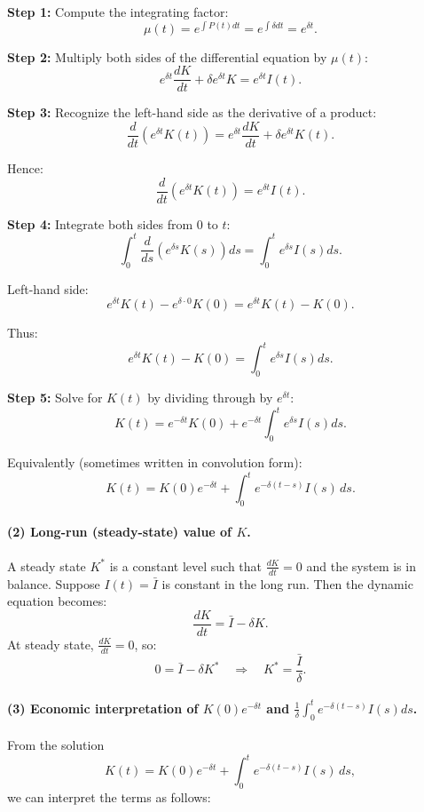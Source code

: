 \documentclass[12pt]{article}
\begin{document}
\textbf{Step 1:} Compute the integrating factor:
\[
\mu(t) = e^{\int P(t)dt} = e^{\int \delta dt} = e^{\delta t}.
\]

\textbf{Step 2:} Multiply both sides of the differential equation by $\mu(t)$:
\[
e^{\delta t}\frac{dK}{dt} + \delta e^{\delta t}K = e^{\delta t}I(t).
\]

\textbf{Step 3:} Recognize the left-hand side as the derivative of a product:
\[
\frac{d}{dt}(e^{\delta t}K(t)) 
= e^{\delta t}\frac{dK}{dt} + \delta e^{\delta t}K(t).
\]

Hence:
\[
\frac{d}{dt}(e^{\delta t}K(t)) = e^{\delta t} I(t).
\]

\textbf{Step 4:} Integrate both sides from $0$ to $t$:
\[
\int_0^t \frac{d}{ds}(e^{\delta s}K(s))ds = \int_0^t e^{\delta s}I(s)ds.
\]

Left-hand side:
\[
e^{\delta t}K(t) - e^{\delta \cdot 0}K(0) 
= e^{\delta t}K(t) - K(0).
\]

Thus:
\[
e^{\delta t}K(t) - K(0) = \int_0^t e^{\delta s}I(s)ds.
\]

\textbf{Step 5:} Solve for $K(t)$ by dividing through by $e^{\delta t}$:
\[
K(t) = e^{-\delta t}K(0) + e^{-\delta t}\int_0^t e^{\delta s}I(s)ds.
\]

Equivalently (sometimes written in convolution form):
\[
\boxed{
K(t)
= K(0)e^{-\delta t} 
+ \int_0^t e^{-\delta (t-s)}I(s)\,ds.
}
\]

\paragraph{(2) Long-run (steady-state) value of $K$.}

A steady state $K^*$ is a constant level such that $\frac{dK}{dt}=0$ and the system is in balance. Suppose $I(t)=\bar{I}$ is constant in the long run. Then the dynamic equation becomes:
\[
\frac{dK}{dt} = \bar{I} - \delta K.
\]
At steady state, $\frac{dK}{dt}=0$, so:
\[
0 = \bar{I} - \delta K^*
\quad\Rightarrow\quad
K^* = \frac{\bar{I}}{\delta}.
\]

\paragraph{(3) Economic interpretation of $K(0)e^{-\delta t}$ and $\displaystyle\frac{1}{\delta}\int_0^t e^{-\delta (t-s)}I(s)ds$.}

From the solution
\[
K(t) = K(0)e^{-\delta t} + \int_0^t e^{-\delta (t-s)}I(s)\,ds,
\]
we can interpret the terms as follows:
\end{document}
